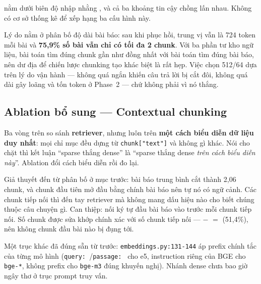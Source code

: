 \NumChunkSpread{} nằm dưới biên độ nhập nhằng \NumNoiseFloor{}, và cả ba khoảng tin
cậy chồng lấn nhau. Không có cơ sở thống kê để xếp hạng ba cấu hình này.

Lý do nằm ở phân bố độ dài bài báo: sau khi phục hồi, trung vị vẫn là 724 token
mỗi bài và \textbf{75{,}9\% số bài vẫn chỉ có tối đa 2 chunk}. Với ba phần tư
kho ngữ liệu, bài toán tìm đúng chunk gần như đồng nhất với bài toán tìm đúng
bài báo, nên dư địa để chiến lược chunking tạo khác biệt là rất hẹp. Việc chọn
512/64 dựa trên lý do vận hành --- không quá ngắn khiến câu trả lời bị cắt đôi,
không quá dài gây loãng và tốn token ở Phase~2 --- chứ không phải vì nó thắng.

\subsection{Ablation bổ sung --- Contextual chunking}

Ba vòng trên so sánh \textbf{retriever}, nhưng luôn trên \textbf{một cách biểu
diễn dữ liệu duy nhất}: mọi chỉ mục đều dựng từ \texttt{chunk["text"]} và không
gì khác. Nói cho chặt thì kết luận ``sparse thắng dense'' là ``sparse thắng
dense \emph{trên cách biểu diễn này}''. Ablation đổi cách biểu diễn rồi đo lại.

Giả thuyết đến từ phân bố ở mục trước: bài báo trung bình cắt thành 2{,}06
chunk, và chunk đầu tiên mở đầu bằng chính bài báo nên tự nó có ngữ cảnh. Các
chunk tiếp nối thì đến tay retriever mà không mang dấu hiệu nào cho biết chúng
thuộc câu chuyện gì. Can thiệp: nối \NumCtxChars{} ký tự đầu bài báo vào trước
mỗi chunk tiếp nối. Số chunk được sửa khớp chính xác với số chunk tiếp nối ---
\NumCorpusChunks{} $-$ \NumCorpusArticles{} $=$ \NumCtxContextualised{} (51{,}4\%),
nên không chunk đầu bài nào bị đụng tới.


Một trục khác đã đúng sẵn từ trước: \texttt{embeddings.py:131-144} áp prefix
chính tắc của từng mô hình (\texttt{query: }/\texttt{passage: } cho e5,
instruction riêng của BGE cho \texttt{bge-*}, không prefix cho \texttt{bge-m3}
đúng khuyến nghị). Nhánh dense chưa bao giờ ngây thơ ở trục prompt truy vấn.

